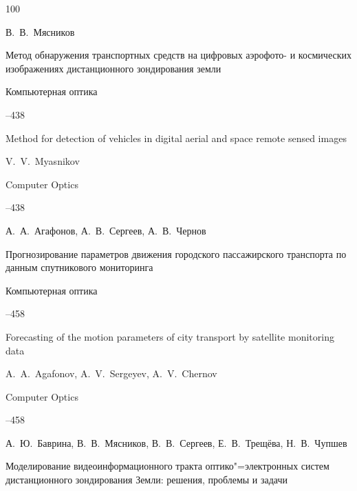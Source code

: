 \begin{thebibliography}{100}

\by В.~В.~Мясников

\paper Метод обнаружения транспортных средств на цифровых аэрофото- и космических изображениях дистанционного зондирования земли

\jour Компьютерная оптика




--438

\misctransl

\paper Method for detection of vehicles in digital aerial and space remote sensed images 

\by V.~V.~Myasnikov 

\jour Computer Optics




--438






\by А.~А.~Агафонов, А.~В.~Сергеев, А.~В.~Чернов

\paper Прогнозирование параметров движения городского пассажирского транспорта по данным спутникового мониторинга

\jour Компьютерная оптика




--458

\misctransl

\paper Forecasting of the motion parameters of city transport by satellite monitoring data

\by A.~A.~Agafonov, A.~V.~Sergeyev, A.~V.~Chernov

\jour Computer Optics




--458






\by А.~Ю.~Баврина, В.~В.~Мясников, В.~В.~Сергеев, Е.~В.~Трещёва, Н.~В.~Чупшев

\paper Моделирование видеоинформационного тракта оптико"=электронных систем дистанционного зондирования Земли: решения, проблемы и задачи


\end{thebibliography}
